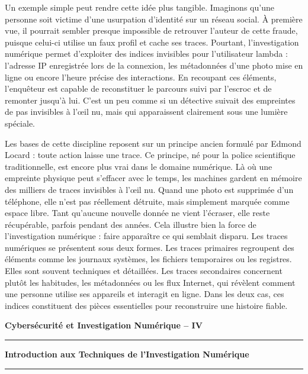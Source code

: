 \documentclass[12pt,a4paper]{article}
\newcommand{\HRule}{\rule{\linewidth}{1pt}}
\begin{document}
	\medskip
	\noindent
	Un exemple simple peut rendre cette idée plus tangible. Imaginons qu’une personne soit victime d’une usurpation d’identité sur un réseau social. À première vue, il pourrait sembler presque impossible de retrouver l’auteur de cette fraude, puisque celui-ci utilise un faux profil et cache ses traces. Pourtant, l’investigation numérique permet d’exploiter des indices invisibles pour l’utilisateur lambda : l’adresse IP enregistrée lors de la connexion, les métadonnées d’une photo mise en ligne ou encore l’heure précise des interactions. En recoupant ces éléments, l’enquêteur est capable de reconstituer le parcours suivi par l’escroc et de remonter jusqu’à lui. C’est un peu comme si un détective suivait des empreintes de pas invisibles à l’œil nu, mais qui apparaissent clairement sous une lumière spéciale.
	
	\medskip
	\noindent
	Les bases de cette discipline reposent sur un principe ancien formulé par Edmond Locard : toute action laisse une trace. Ce principe, né pour la police scientifique traditionnelle, est encore plus vrai dans le domaine numérique. Là où une empreinte physique peut s’effacer avec le temps, les machines gardent en mémoire des milliers de traces invisibles à l’œil nu. Quand une photo est supprimée d’un téléphone, elle n’est pas réellement détruite, mais simplement marquée comme espace libre. Tant qu’aucune nouvelle donnée ne vient l’écraser, elle reste récupérable, parfois pendant des années. Cela illustre bien la force de l’investigation numérique : faire apparaître ce qui semblait disparu. Les traces numériques se présentent sous deux formes. Les traces primaires regroupent des éléments comme les journaux systèmes, les fichiers temporaires ou les registres. Elles sont souvent techniques et détaillées. Les traces secondaires concernent plutôt les habitudes, les métadonnées ou les flux Internet, qui révèlent comment une personne utilise ses appareils et interagit en ligne. Dans les deux cas, ces indices constituent des pièces essentielles pour reconstruire une histoire fiable.
	
	\vfill
	
	\begin{flushleft}
		\textbf{Cybersécurité et Investigation Numérique -- IV}
		\HRule 
	\end{flushleft}  
	
	\newpage 
	
	\begin{flushright}
		\textbf{Introduction aux Techniques de l'Investigation Numérique}
		\HRule
	\end{flushright}
	
\end{document}
